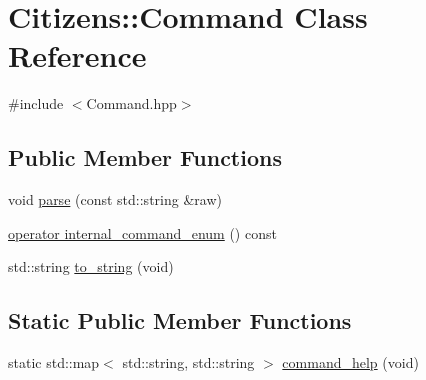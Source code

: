 \hypertarget{classCitizens_1_1Command}{
\section{Citizens::Command Class Reference}
\label{classCitizens_1_1Command}
}


{\ttfamily \#include $<$Command.hpp$>$}

\subsection*{Public Member Functions}
\begin{DoxyCompactItemize}
\item 
void \hyperlink{classCitizens_1_1Command_ac4a8de50e5f193bb3dceaab1a21e8ca6}{parse} (const std::string \&raw)
\item 
\hyperlink{classCitizens_1_1Command_ad043051eca75e49b77273767930f0c56}{operator internal\_\-command\_\-enum} () const 
\item 
std::string \hyperlink{classCitizens_1_1Command_a416e76b6361169403b5bb2295b2117eb}{to\_\-string} (void)
\end{DoxyCompactItemize}
\subsection*{Static Public Member Functions}
\begin{DoxyCompactItemize}
\item 
static std::map$<$ std::string, std::string $>$ \hyperlink{classCitizens_1_1Command_a2e7a0f59333af2d18dd20439501d8c2c}{command\_\-help} (void)
\end{DoxyCompactItemize}


